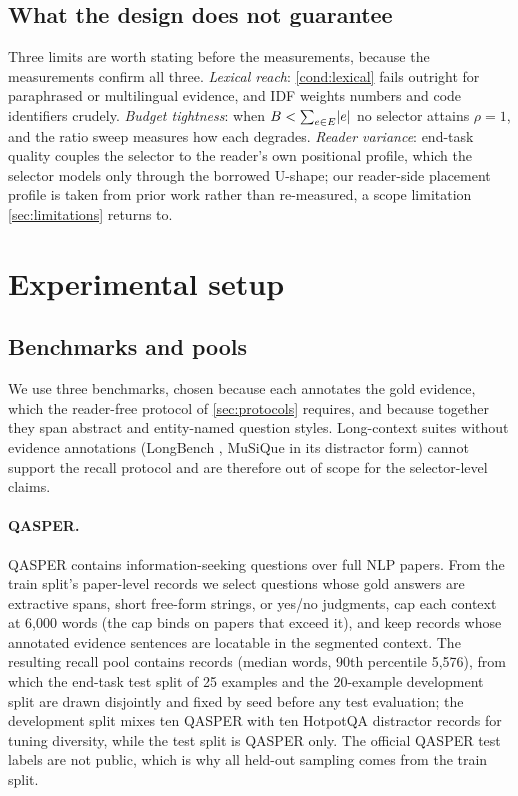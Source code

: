 \documentclass[review,12pt]{elsarticle}
\DeclarePairedDelimiter\abs{\lvert}{\rvert}
\theoremstyle{remark}
\begin{document}
\subsection{What the design does not guarantee}
Three limits are worth stating before the measurements, because the
measurements confirm all three. \emph{Lexical reach}:
\autoref{cond:lexical} fails outright for paraphrased or multilingual
evidence, and IDF weights numbers and code identifiers crudely.
\emph{Budget tightness}: when
$B < \sum_{e \in E} \abs{e}$ no selector attains $\rho = 1$, and the
ratio sweep measures how each degrades. \emph{Reader variance}:
end-task quality couples the selector to the reader's own positional
profile, which the selector models only through the borrowed U-shape;
our reader-side placement profile is taken from prior work rather than
re-measured, a scope limitation \autoref{sec:limitations} returns to.

\section{Experimental setup}
\label{sec:exp}

\subsection{Benchmarks and pools}
\label{sec:pools}
We use three benchmarks, chosen because each annotates the gold
evidence, which the reader-free protocol of \autoref{sec:protocols}
requires, and because together they span abstract and entity-named
question styles. Long-context suites without evidence annotations
(LongBench \citep{bai2023longbench}, MuSiQue \citep{trivedi2022musique}
in its distractor form) cannot support the recall protocol and are
therefore out of scope for the selector-level claims.

\paragraph{QASPER.}
QASPER \citep{dasigi2021qasper} contains information-seeking questions
over full NLP papers. From the train split's paper-level records we
select questions whose gold answers are extractive spans, short
free-form strings, or yes/no judgments, cap each context at 6{,}000
words (the cap binds on papers that exceed it), and keep records whose
annotated evidence sentences are locatable in the segmented context.
The resulting recall pool contains \NRecQ{} records (median
\PoolQMedWords{} words, 90th percentile 5{,}576), from which the
end-task test split of 25 examples and the 20-example development
split are drawn disjointly and fixed by seed before any test
evaluation; the development split mixes ten QASPER with ten HotpotQA
distractor records for tuning diversity, while the test split is
QASPER only. The official QASPER test labels are not public, which is
why all held-out sampling comes from the train split.
\end{document}
